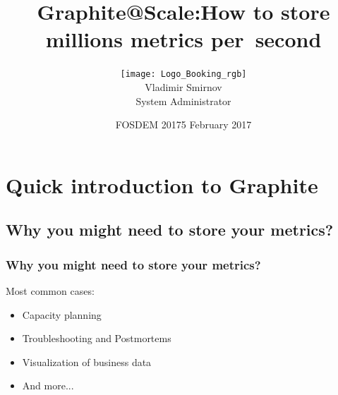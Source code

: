 \documentclass[aspectratio=43, unicode, notheorems, xcolor={dvipsnames}]{beamer}
\title{\Huge{Graphite@Scale:}\newline\Large{How to store millions metrics per~second}}
\author{\newline\texttt{[image: Logo\_Booking\_rgb]}\\Vladimir Smirnov \\System Administrator}
\date{\newline\newline\newline\newline\newline\newline{}FOSDEM 2017\newline{}\footnotesize{5 February 2017}}
\begin{document}
\begin{frame}
    \maketitle
\end{frame}

\section{Quick introduction to Graphite}
\subsection{Why you might need to store your metrics?}
\begin{frame}
    \frametitle{Why you might need to store your metrics?}
    \Large{
    Most common cases:
    \begin{itemize}
	\item Capacity planning
	\item Troubleshooting and Postmortems
	\item Visualization of business data
	\item And more...
    \end{itemize}
    }
\end{frame}
\end{document}
